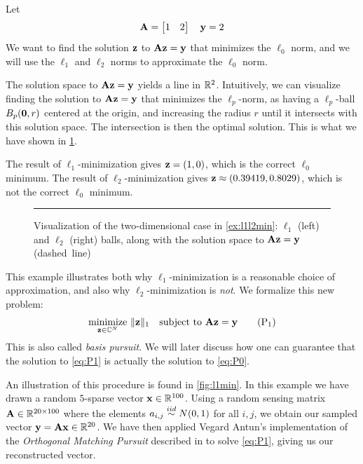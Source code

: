 \begin{example} \label{ex:l1l2min}
Let
\[ 
	\mathbf{A} = \begin{bmatrix}1 & 2\end{bmatrix} \quad \mathbf{y} = 2
\]
We want to find the solution $ \mathbf{z} $ to $ \mathbf{A}\mathbf{z} = \mathbf{y} $ that minimizes the $ \ell_{0} $ norm, and we will use the $ \ell_{1} $ and $ \ell_{2} $ norms to approximate the $ \ell_{0} $ norm.

The solution space to $ \mathbf{A}\mathbf{z} = \mathbf{y} $ yields a line in $ \mathbb{R}^{2} $. Intuitively, we can visualize finding the solution to $ \mathbf{A}\mathbf{z} = \mathbf{y} $ that minimizes the $ \ell_{p} $-norm, as having a $ \ell_{p} $-ball $ B_{p}(\mathbf{0}, r) $ centered at the origin, and increasing the radius $ r $ until it intersects with this solution space. The intersection is then the optimal solution. This is what we have shown in \cref{fig:l1l2balls}.

The result of $ \ell_{1} $-minimization gives $ \mathbf{z} = (1, 0) $, which is the correct $ \ell_{0} $ minimum. The result of $ \ell_{2} $-minimization gives $ \mathbf{z} \approx (0.39419, 0.8029) $, which is not the correct $ \ell_{0} $ minimum. 
\end{example}
\begin{figure}[t]
	\centering
	
	\caption{Visualization of the two-dimensional case in \cref{ex:l1l2min}: $ \ell_{1} $ (left) and $ \ell_{2} $ (right) balls, along with the solution space to $ \mathbf{A}\mathbf{z} = \mathbf{y} $ (dashed~line)}
	\label{fig:l1l2balls}
	\vspace{4pt}\hrule
\end{figure}

This example illustrates both why $ \ell_{1} $-minimization is a reasonable choice of approximation, and also why $ \ell_{2} $-minimization is \textit{not}. We formalize this new problem:
\begin{equation}
	\underset{\mathbf{z} \in \mathbb{C}^{N}}{\text{minimize}}~ \lVert\mathbf{z}\rVert_1
	\quad\text{subject to}~ \mathbf{A}\mathbf{z} = \mathbf{y}
	\tag{P$_1$}
	\label{eq:P1}
\end{equation}
This is also called \textit{basis pursuit}. We will later discuss how one can guarantee that the solution to \eqref{eq:P1} is actually the solution to \eqref{eq:P0}.

An illustration of this procedure is found in \cref{fig:l1min}. In this example we have drawn a random $ 5 $-sparse vector $ \mathbf{x} \in \mathbb{R}^{100} $. Using a random sensing matrix $ \mathbf{A} \in \mathbb{R}^{20\times 100} $ where the elements $ a_{i,j} \stackrel{iid}{\sim} N(0, 1) $ for all $ i,j $,  we obtain our sampled vector $ \mathbf{y} = \mathbf{A}\mathbf{x} \in\mathbb{R}^{20} $. We have then applied Vegard Antun's implementation of the \textit{Orthogonal Matching Pursuit} described in \cite[Section~3.2]{foucart13intro} to solve \eqref{eq:P1}, giving us our reconstructed vector.\nocite{antunAlgs}

